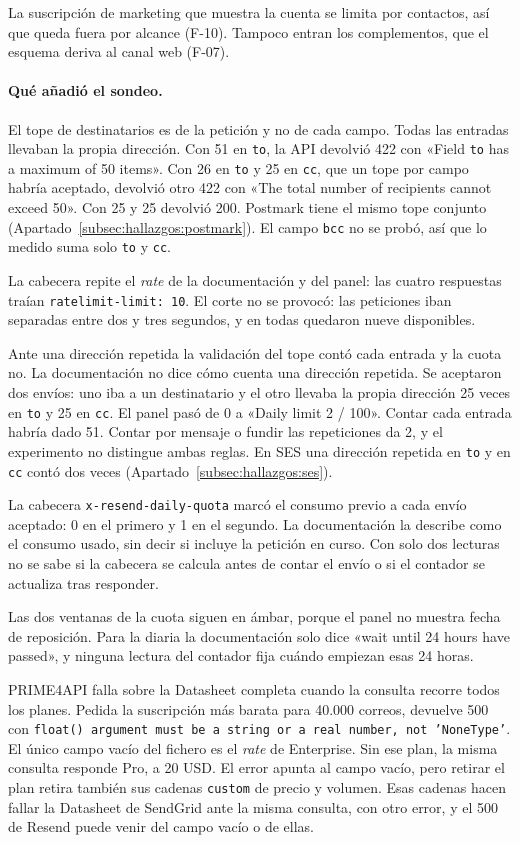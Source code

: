 La suscripción de marketing que muestra la cuenta se limita por contactos, así que queda
fuera por alcance (F-10). Tampoco entran los complementos, que el esquema deriva al
canal web (F-07).

\paragraph{Qué añadió el sondeo.} El tope de destinatarios es de la petición y no de cada
campo. Todas las entradas llevaban la propia dirección. Con 51 en \texttt{to}, la API
devolvió 422 con «Field \texttt{to} has a maximum of 50 items». Con 26 en \texttt{to} y
25 en \texttt{cc}, que un tope por campo habría aceptado, devolvió otro 422 con «The total
number of recipients cannot exceed 50». Con 25 y 25 devolvió 200. Postmark
tiene el mismo tope conjunto (Apartado~\ref{subsec:hallazgos:postmark}). El campo
\texttt{bcc} no se probó, así que lo medido suma solo \texttt{to} y \texttt{cc}.

La cabecera repite el \textit{rate} de la documentación y del panel: las cuatro respuestas
traían \texttt{ratelimit-limit: 10}. El corte no se provocó: las peticiones iban
separadas entre dos y tres segundos, y en todas quedaron nueve disponibles.

Ante una dirección repetida la validación del tope contó cada entrada y la cuota no. La
documentación no dice cómo cuenta una dirección repetida. Se aceptaron dos envíos: uno iba
a un destinatario y el otro llevaba la propia dirección 25 veces en \texttt{to} y 25 en
\texttt{cc}. El panel pasó de 0 a «Daily limit 2 / 100». Contar cada entrada habría dado
51. Contar por mensaje o fundir las repeticiones da 2, y el experimento no distingue ambas
reglas. En SES una dirección repetida en \texttt{to} y en \texttt{cc} contó dos veces
(Apartado~\ref{subsec:hallazgos:ses}).

La cabecera \texttt{x-resend-daily-quota} marcó el consumo previo a cada envío aceptado: 0
en el primero y 1 en el segundo. La documentación la describe como el consumo usado, sin
decir si incluye la petición en curso. Con solo dos lecturas no se sabe si la cabecera se calcula antes de contar el envío o si el contador se actualiza tras responder.

Las dos ventanas de la cuota siguen en ámbar, porque el panel no muestra fecha de
reposición. Para la diaria la documentación solo dice «wait until 24 hours have passed», y ninguna
lectura del contador fija cuándo empiezan esas 24 horas.

PRIME4API falla sobre la Datasheet completa cuando la consulta
recorre todos los planes. Pedida la
suscripción más barata para 40.000 correos, devuelve 500 con \texttt{float() argument must
be a string or a real number, not 'NoneType'}. El único campo vacío del fichero es el
\textit{rate} de Enterprise. Sin ese plan, la misma consulta responde Pro, a 20 USD. El
error apunta al campo vacío, pero retirar el plan retira también sus cadenas
\texttt{custom} de precio y volumen. Esas cadenas hacen fallar la Datasheet de SendGrid ante la misma consulta, con otro error, y el 500 de Resend puede venir del campo vacío o de ellas.

